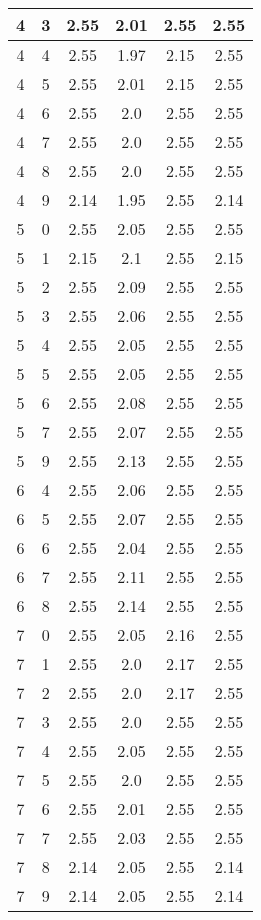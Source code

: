 \begin{longtable}{|c|c||c||c|c||c|}
	4 & 3 & 2.55 & 2.01 & 2.55 & 2.55 \\ \hline
	4 & 4 & 2.55 & 1.97 & 2.15 & 2.55 \\ \hline
	4 & 5 & 2.55 & 2.01 & 2.15 & 2.55 \\ \hline
	4 & 6 & 2.55 & 2.0 & 2.55 & 2.55 \\ \hline
	4 & 7 & 2.55 & 2.0 & 2.55 & 2.55 \\ \hline
	4 & 8 & 2.55 & 2.0 & 2.55 & 2.55 \\ \hline
	4 & 9 & 2.14 & 1.95 & 2.55 & 2.14 \\ \hline
	5 & 0 & 2.55 & 2.05 & 2.55 & 2.55 \\ \hline
	5 & 1 & 2.15 & 2.1 & 2.55 & 2.15 \\ \hline
	5 & 2 & 2.55 & 2.09 & 2.55 & 2.55 \\ \hline
	5 & 3 & 2.55 & 2.06 & 2.55 & 2.55 \\ \hline
	5 & 4 & 2.55 & 2.05 & 2.55 & 2.55 \\ \hline
	5 & 5 & 2.55 & 2.05 & 2.55 & 2.55 \\ \hline
	5 & 6 & 2.55 & 2.08 & 2.55 & 2.55 \\ \hline
	5 & 7 & 2.55 & 2.07 & 2.55 & 2.55 \\ \hline
	5 & 9 & 2.55 & 2.13 & 2.55 & 2.55 \\ \hline
	6 & 4 & 2.55 & 2.06 & 2.55 & 2.55 \\ \hline
	6 & 5 & 2.55 & 2.07 & 2.55 & 2.55 \\ \hline
	6 & 6 & 2.55 & 2.04 & 2.55 & 2.55 \\ \hline
	6 & 7 & 2.55 & 2.11 & 2.55 & 2.55 \\ \hline
	6 & 8 & 2.55 & 2.14 & 2.55 & 2.55 \\ \hline
	7 & 0 & 2.55 & 2.05 & 2.16 & 2.55 \\ \hline
	7 & 1 & 2.55 & 2.0 & 2.17 & 2.55 \\ \hline
	7 & 2 & 2.55 & 2.0 & 2.17 & 2.55 \\ \hline
	7 & 3 & 2.55 & 2.0 & 2.55 & 2.55 \\ \hline
	7 & 4 & 2.55 & 2.05 & 2.55 & 2.55 \\ \hline
	7 & 5 & 2.55 & 2.0 & 2.55 & 2.55 \\ \hline
	7 & 6 & 2.55 & 2.01 & 2.55 & 2.55 \\ \hline
	7 & 7 & 2.55 & 2.03 & 2.55 & 2.55 \\ \hline
	7 & 8 & 2.14 & 2.05 & 2.55 & 2.14 \\ \hline
	7 & 9 & 2.14 & 2.05 & 2.55 & 2.14 \\ \hline
\end{longtable}
